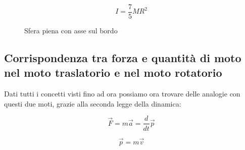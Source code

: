 \begin{figure}[H]
    \centering
    \begin{minipage}[c]{0.4\textwidth}
    \centering
    \caption{Sfera piena con asse sul bordo}
    \end{minipage}
    \hspace{0.1mm}
    \begin{minipage}[c]{0.4\textwidth}
    \centering
    \begin{equation}
            I = \frac{7}{5}MR^2
        \end{equation}
    \end{minipage}
    \label{fig:sferaPienBordoInerzia}
\end{figure}


\paragraph{}

\subsection{Corrispondenza tra forza e quantità di moto nel moto traslatorio e nel moto rotatorio}
Dati tutti i concetti visti fino ad ora possiamo ora trovare delle analogie con questi due moti, grazie alla seconda legge della dinamica:


\begin{figure}[H]
    \centering
    \begin{minipage}[c]{0.4\textwidth}
    \centering
    \begin{equation*}
    \vec{F} = m\vec{a} = \frac{d}{dt}\vec{p}
    \end{equation*}
    \end{minipage}
    \begin{minipage}[c]{0.4\textwidth}
    \centering
    \hspace{0.1mm}
    \begin{equation*}
        \vec{p} = m\vec{v}
    \end{equation*}
    \end{minipage}
\end{figure}


